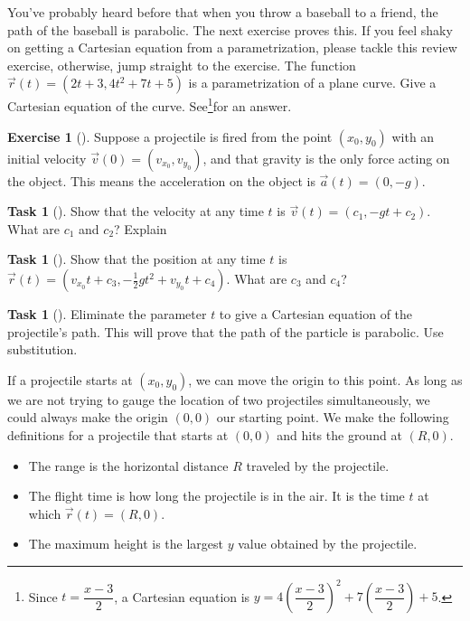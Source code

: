 \documentclass[10pt,]{book}
\theoremstyle{plain}
\theoremstyle{definition}
\theoremstyle{definition}
\theoremstyle{definition}
\theoremstyle{definition}
\newtheorem{exploration}[project]{Exercise}
\newtheorem{task}[project]{Task}
\theoremstyle{definition}
\numberwithin{equation}{section}
\begin{document}
%
\par
You've probably heard before that when you throw a baseball to a friend, the path of the baseball is parabolic. The next exercise proves this. If you feel shaky on getting a Cartesian equation from a parametrization, please tackle this review exercise, otherwise, jump straight to the exercise.%
The function \(\vec r(t) = (2t+3, 4t^2+7t+5)\) is a parametrization of a plane curve. Give a Cartesian equation of the curve. See\footnote{Since \(t=\dfrac{x-3}{2}\), a Cartesian equation is \(y = 4\left(\dfrac{x-3}{2}\right)^2+7\left(\dfrac{x-3}{2}\right)+5\).\label{fn-7}}for an answer.%
\begin{exploration}[]\label{exploration-161}
Suppose a projectile is fired from the point \((x_0,y_0)\) with an initial velocity \(\vec v(0)=(v_{x_0},v_{y_0})\), and that gravity is the only force acting on the object. This means the acceleration on the object is \(\vec a(t) = (0,-g)\).%
\begin{task}[]\label{task-373}
Show that the velocity at any time \(t\) is \(\vec v(t) = (c_1,-gt+c_2)\). What are \(c_1\) and \(c_2\)? Explain%
\end{task}
\begin{task}[]\label{task-374}
Show that the position at any time \(t\) is \(\vec r(t) = (v_{x_0}t+c_3, -\frac{1}{2}gt^2+v_{y_0}t+c_4)\). What are \(c_3\) and \(c_4\)?%
\end{task}
\begin{task}[]\label{task-375}
Eliminate the parameter \(t\) to give a Cartesian equation of the projectile's path. This will prove that the path of the particle is parabolic. Use substitution.%
%
\end{task}
\end{exploration}
If a projectile starts at \((x_0,y_0)\), we can move the origin to this point. As long as we are not trying to gauge the location of two projectiles simultaneously, we could always make the origin \((0,0)\) our starting point. We make the following definitions for a projectile that starts at \((0,0)\) and hits the ground at \((R,0)\). \leavevmode%
\begin{itemize}[label=\textbullet]
\item{}The range is the horizontal distance \(R\) traveled by the projectile.%
\item{}The flight time is how long the projectile is in the air. It is the time \(t\) at which \(\vec r(t)=(R,0)\).%
\item{}The maximum height is the largest \(y\) value obtained by the projectile.%
\end{itemize}
\end{document}
